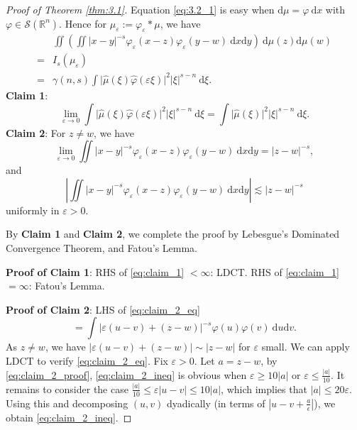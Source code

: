 \begin{proof}[Proof of Theorem \ref{thm:3.1}]
Equation \eqref{eq:3.2_1} is easy when $\mathrm{d}\mu=\varphi\ \mathrm{d}x$ with $\varphi \in \mathscr{S}(\mathbb{R}^{n})$. Hence for $\mu _{\varepsilon}:=\varphi _{\varepsilon}*\mu$, we have
$$
\begin{aligned}
 & \iint\left(\iint \lvert x-y \rvert ^{-s}\varphi _{\varepsilon}(x-z)\varphi _{\varepsilon}(y-w)\ \mathrm{d}x\mathrm{d}y\right)\ \mathrm{d}\mu(z)\mathrm{d}\mu(w) \\
= & I_{s}(\mu _{\varepsilon}) \\
= & \gamma(n,s)\int \lvert \hat{\mu}(\xi)\hat{\varphi}(\varepsilon \xi) \rvert ^{2}\lvert \xi \rvert ^{s-n}\ \mathrm{d}\xi.
\end{aligned}
$$
\textbf{Claim 1}:
\begin{equation}\label{eq:claim_1}
\lim_{ \varepsilon \to 0 }\int \lvert \hat{\mu}(\xi)\hat{\varphi}(\varepsilon \xi) \rvert^{2}\lvert \xi \rvert^{s-n}\ \mathrm{d}\xi=\int \lvert \hat{\mu}(\xi) \rvert^{2}\lvert \xi \rvert^{s-n}\ \mathrm{d}\xi.
\end{equation}
\textbf{Claim 2}: For $z\neq w$, we have
\begin{equation}\label{eq:claim_2_eq}
\lim_{ \varepsilon \to 0 } \iint \lvert x-y \rvert ^{-s}\varphi _{\varepsilon}(x-z)\varphi _{\varepsilon}(y-w)\ \mathrm{d}x\mathrm{d}y=\lvert z-w \rvert ^{-s},
\end{equation}
and
\begin{equation}\label{eq:claim_2_ineq}
\left\lvert \iint \lvert x-y \rvert ^{-s}\varphi _{\varepsilon}(x-z)\varphi _{\varepsilon}(y-w)\ \mathrm{d}x\mathrm{d}y \right\rvert\lesssim \lvert z-w \rvert ^{-s}
\end{equation}
uniformly in $\varepsilon>0$.

By \textbf{Claim 1} and \textbf{Claim 2}, we complete the proof by Lebesgue's Dominated Convergence Theorem, and Fatou's Lemma.

\textbf{Proof of Claim 1}:
RHS of \eqref{eq:claim_1} $< \infty$: LDCT.
RHS of \eqref{eq:claim_1} $=\infty$: Fatou's Lemma.

\textbf{Proof of Claim 2}:
LHS of \eqref{eq:claim_2_eq}
\begin{equation}\label{eq:claim_2_proof}
=\int \lvert \varepsilon(u-v)+(z-w) \rvert^{-s}\varphi(u)\varphi(v)\ \mathrm{d}u\mathrm{d}v.
\end{equation}
As $z\neq w$, we have $\lvert \varepsilon(u-v)+(z-w) \rvert \sim \lvert z-w \rvert$ for $\varepsilon$ small. We can apply LDCT to verify \eqref{eq:claim_2_eq}.
Fix $\varepsilon>0$. Let $a=z-w$, by \eqref{eq:claim_2_proof}, \eqref{eq:claim_2_ineq} is obvious when $\varepsilon\geq 10\lvert a \rvert$ or $\varepsilon\leq \frac{\lvert a \rvert}{10}$. It remains to consider the case $\frac{\lvert a \rvert}{10}\leq \varepsilon \lvert u-v \rvert\leq 10\lvert a \rvert$, which implies that $\lvert a \rvert\leq 20\varepsilon$. Using this and decomposing $(u,v)$ dyadically (in terms of $\left\lvert  u-v+\frac{a}{\epsilon}  \right\rvert$), we obtain \eqref{eq:claim_2_ineq}.
\end{proof}



